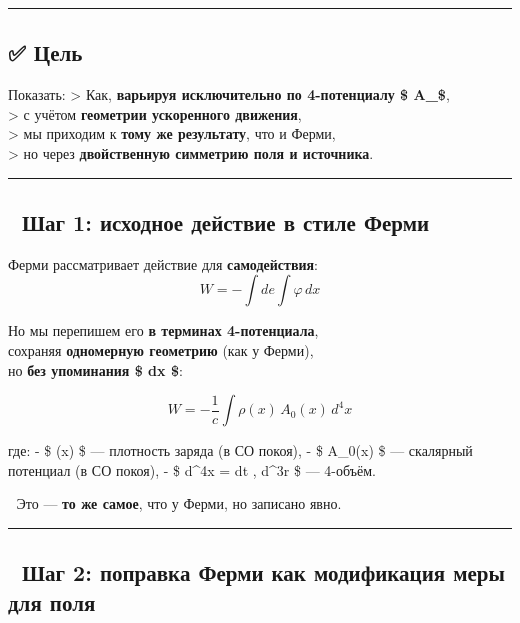 \documentclass[11pt]{article}
\begin{document}
\begin{center}\rule{0.5\linewidth}{\linethickness}\end{center}

\subsection{✅ Цель}\label{ux446ux435ux43bux44c-1}

Показать: \textgreater{} Как, \textbf{варьируя исключительно по
4-потенциалу \$ A\_\mu \$},\\
\textgreater{} с учётом \textbf{геометрии ускоренного движения},\\
\textgreater{} мы приходим к \textbf{тому же результату}, что и Ферми,\\
\textgreater{} но через \textbf{двойственную симметрию поля и
источника}.

\begin{center}\rule{0.5\linewidth}{\linethickness}\end{center}

\subsection{🔹 Шаг 1: исходное действие в стиле
Ферми}\label{ux448ux430ux433-1-ux438ux441ux445ux43eux434ux43dux43eux435-ux434ux435ux439ux441ux442ux432ux438ux435-ux432-ux441ux442ux438ux43bux435-ux444ux435ux440ux43cux438}

Ферми рассматривает действие для \textbf{самодействия}: \[
W = -\int de \int \varphi \, dx
\]

Но мы перепишем его \textbf{в терминах 4-потенциала},\\
сохраняя \textbf{одномерную геометрию} (как у Ферми),\\
но \textbf{без упоминания \$ dx \$}:

\[
\boxed{
W = -\frac{1}{c} \int \rho(x) \, A_0(x) \, d^4x
}
\]

где: - \$ \rho(x) \$ --- плотность заряда (в СО покоя), - \$ A\_0(x) \$
--- скалярный потенциал (в СО покоя), - \$ d\^{}4x = dt , d\^{}3r \$ ---
4-объём.

📌 Это --- \textbf{то же самое}, что у Ферми, но записано явно.

\begin{center}\rule{0.5\linewidth}{\linethickness}\end{center}

\subsection{🔹 Шаг 2: поправка Ферми как модификация меры для
поля}\label{ux448ux430ux433-2-ux43fux43eux43fux440ux430ux432ux43aux430-ux444ux435ux440ux43cux438-ux43aux430ux43a-ux43cux43eux434ux438ux444ux438ux43aux430ux446ux438ux44f-ux43cux435ux440ux44b-ux434ux43bux44f-ux43fux43eux43bux44f}
\end{document}
